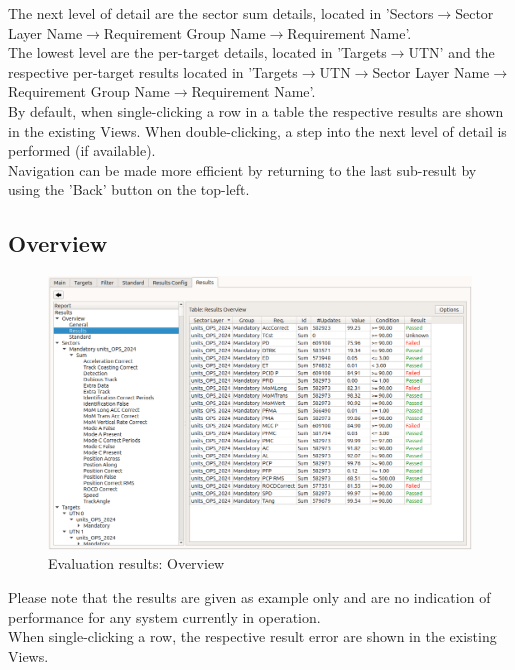 The next level of detail are the sector sum details, located in 'Sectors$\rightarrow$Sector Layer Name$\rightarrow$Requirement Group Name$\rightarrow$Requirement Name'. \\

The lowest level are the per-target details, located in 'Targets$\rightarrow$UTN' and the respective per-target results located in 'Targets$\rightarrow$UTN$\rightarrow$Sector Layer Name$\rightarrow$Requirement Group Name$\rightarrow$Requirement Name'. \\

By default, when single-clicking a row in a table the respective results are shown in the existing Views. When double-clicking, a step into the next level of detail is performed (if available). \\

Navigation can be made more efficient by returning to the last sub-result by using the 'Back' button on the top-left.

\subsection{Overview}
\begin{figure}[H]
  \hspace*{-2cm}
    \includegraphics[width=18cm,frame]{figures/eval_results_overview.png}
  \caption{Evaluation results: Overview}
\end{figure}

Please note that the results are given as example only and are no indication of performance for any system currently in operation. \\

When single-clicking a row, the respective result error are shown in the existing Views.

